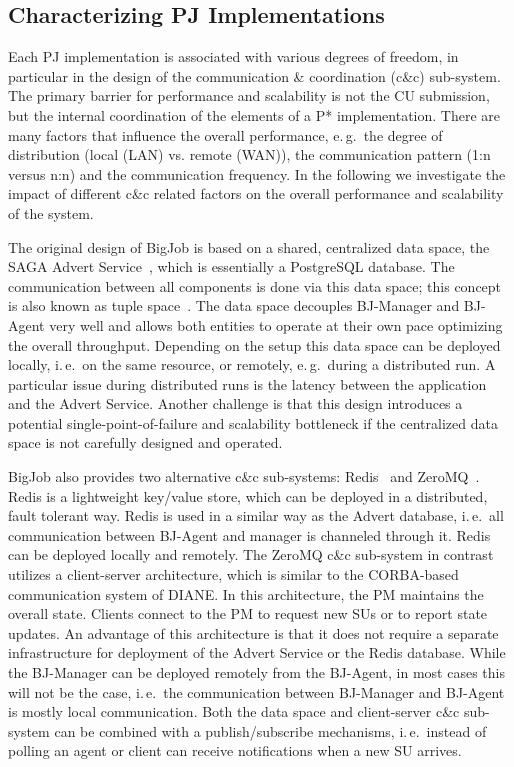 \documentclass[conference,final]{IEEEtran}
\newcommand{\cu}{CU\xspace}
\newcommand{\upp}{\vspace*{-0.5em}}
\begin{document}
\subsection{Characterizing PJ Implementations\upp\upp}
\label{sec:pj_performance}
Each PJ implementation is associated with various degrees of freedom,
in particular in the design of the communication \& coordination
(c\&c) sub-system.  The primary barrier for performance and
scalability is not the \cu  submission, but the internal coordination of
the elements of a P* implementation. There are many factors that
influence the overall performance, e.\,g.\ the degree of distribution
(local (LAN) vs. remote (WAN)), the communication pattern (1:n versus
n:n) and the communication frequency. In the following we investigate
the impact of different c\&c related factors on the overall
performance and scalability of the system.

The original design of BigJob is based on a shared, centralized data
space, the SAGA Advert Service~\cite{saga_advert}, which is
essentially a PostgreSQL database. The communication between all
components is done via this data space; this concept is also known as
tuple space~\cite{Gelernter:1985:GCL:2363.2433}.  The data space
decouples BJ-Manager and BJ-Agent very well and allows both entities
to operate at their own pace optimizing the overall throughput.
Depending on the setup this data space can be deployed locally,
i.\,e.\ on the same resource, or remotely, e.\,g.\ during a
distributed run. A particular issue during distributed runs is the
latency between the application and the Advert Service. Another
challenge is that this design introduces a potential
single-point-of-failure and scalability bottleneck if the centralized
data space is not carefully designed and operated.


BigJob also provides two alternative c\&c sub-systems:
Redis~\cite{redis} and ZeroMQ~\cite{zmq}. Redis is a lightweight
key/value store, which can be deployed in a distributed, fault
tolerant way. Redis is used in a similar way as the Advert database,
i.\,e.\ all communication between BJ-Agent and manager is channeled
through it. Redis can be deployed locally and remotely.  The ZeroMQ
c\&c sub-system in contrast utilizes a client-server architecture,
which is similar to the CORBA-based~\cite{OMG-CORBA303:2004}
communication system of DIANE. In this architecture, the PM maintains
the overall state. Clients connect to the PM to request new SUs or to
report state updates. An advantage of this architecture is that it
does not require a separate infrastructure for deployment of the
Advert Service or the Redis database. While the BJ-Manager can be
deployed remotely from the BJ-Agent, in most cases this will not be
the case, i.\,e.\ the communication between BJ-Manager and BJ-Agent is
mostly local communication. Both the data space and client-server c\&c
sub-system can be combined with a publish/subscribe mechanisms,
i.\,e.\ instead of polling an agent or client can receive
notifications when a new SU arrives. 
\end{document}
